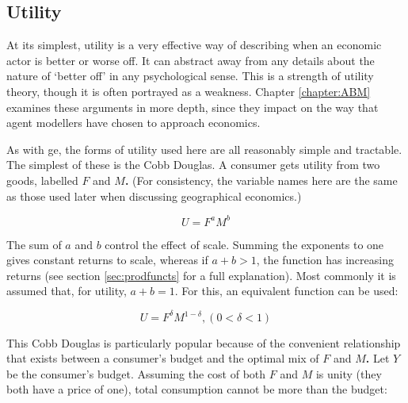 \subsection{Utility \label{sec:utilityintro}}


At its simplest, utility is a very effective way of describing when an economic actor is better or worse off. It can abstract away from any details about the nature of `better off' in any psychological sense. This is a strength of utility theory, though it is often portrayed as a weakness. Chapter \ref{chapter:ABM} examines these arguments in more depth, since they impact on the way that agent modellers have chosen to approach economics. 

As with \gls{ge}, the forms of utility used here are all reasonably simple and tractable. The simplest of these is the Cobb Douglas. A consumer gets utility from two goods, labelled $F$ and \textbf{$M$.} (For consistency, the variable names here are the same as those used later when discussing geographical economics.)

\begin{equation}
U=F^{a}M^{b}\label{eq:-1}
\end{equation}

The sum of $a$ and \textbf{$b$} control the effect of scale. Summing the exponents to one gives constant returns to scale, whereas if $a+b>1$, the function has increasing returns (see section \ref{sec:prodfuncts} for a full explanation). Most commonly it is assumed that, for utility, $a+b=1$. For this, an equivalent function can be used:

\begin{equation}
U=F^{\delta}M{}^{1-\delta},(0<\delta<1)\label{eq:-3}
\end{equation}

This Cobb Douglas is particularly popular because of the convenient relationship that exists between a consumer's budget and the optimal mix of $F$ and \textbf{$M$. }Let $Y$ be the consumer's budget. Assuming the cost of both $F$ and \textbf{$M$} is unity (they both have a price of one), total consumption cannot be more than the budget:  


